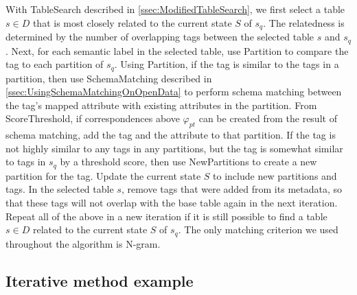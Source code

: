 With TableSearch described in \autoref{ssec:ModifiedTableSearch}, we first select a table $s\in D$ that is most closely related to the current state $S$ of $s_q$. The relatedness is determined by the number of overlapping tags between the selected table $s$ and $s_q$. Next, for each semantic label in the selected table, use Partition to compare the tag to each partition of $s_q$. Using Partition, if the tag is similar to the tags in a partition, then use SchemaMatching described in \autoref{ssec:UsingSchemaMatchingOnOpenData} to perform schema matching between the tag's mapped attribute with existing attributes in the partition. From ScoreThreshold, if correspondences above $\ensuremath{\varphi}_{pt}$ can be created from the result of schema matching, add the tag and the attribute to that partition. If the tag is not highly similar to any tags in any partitions, but the tag is somewhat similar to tags in $s_q$ by a threshold score, then use NewPartitions to create a new partition for the tag. Update the current state $S$ to include new partitions and tags. In the selected table $s$, remove tags that were added from its metadata, so that these tags will not overlap with the base table again in the next iteration. Repeat all of the above in a new iteration if it is still possible to find a table $s\in D$ related to the current state $S$ of $s_q$. The only matching criterion we used throughout the algorithm is N-gram.

\subsection{Iterative method example}
\label{ssec:IterativeMethodExample}

